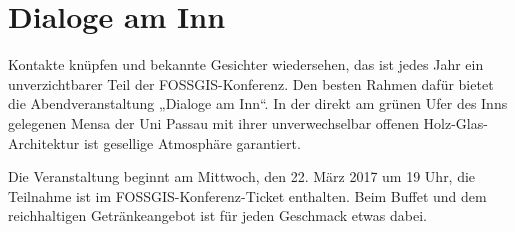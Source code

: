 \newpage
\thispagestyle{cropmarksstyle}
\section*{Dialoge am Inn}
\label{social-event}
Kontakte knüpfen und bekannte Gesichter wiedersehen, das ist jedes Jahr ein unverzichtbarer Teil der
FOSSGIS-Konferenz. Den besten Rahmen dafür bietet die Abendveranstaltung „Dialoge am Inn“. In der
direkt am grünen Ufer des Inns gelegenen Mensa der Uni Passau mit ihrer unverwechselbar offenen
Holz-Glas-Architektur ist gesellige Atmosphäre garantiert.

Die Veranstaltung beginnt am Mittwoch, den 22. März 2017 um 19 Uhr, die Teilnahme ist im
FOSSGIS-Konferenz-Ticket enthalten. Beim Buffet und dem reichhaltigen Getränkeangebot ist für jeden
Geschmack etwas dabei.
\newpage
